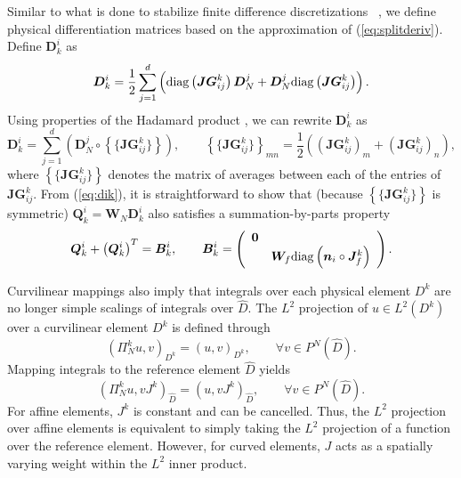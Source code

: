 \documentclass[preprint,10pt]{article}
\theoremstyle{definition}
\theoremstyle{lemma}
\theoremstyle{theorem}
\theoremstyle{assumption}
\renewcommand{\hat}{\widehat}
\newcommand{\LRp}[1]{\left( #1 \right)}
\newcommand{\LRc}[1]{\left\{ #1 \right\}}
\newcommand{\avg}[1] {\ensuremath{\LRc{\!\{#1\}\!}}}
\newcommand{\note}[1]{{\color{blue}{#1}}}
\newcommand{\lcwnote}[1]{{\color{magenta}{#1}}}
\newcommand{\diag}[1]{{\rm diag}\LRp{#1}}
\begin{document}
{Similar to what is done to stabilize finite difference discretizations~\cite{nordstrom2006cfdf, gassner2016split} \lcwnote{(Check to see if we can find an earlier reference to this type of approximation.)} \note{I don't know if there is - I've noticed even Gassner and the SBP folks don't seem to cite anything on this}, we define physical differentiation matrices based on the approximation of (\ref{eq:splitderiv}).  Define $\bm{D}^i_k$ as
\[
  \bm{D}^i_k = \frac12 \sum_{j=1}^d \left(\diag{\bm{JG}^k_{ij}}\bm{D}^j_N + \bm{D}^j_N\diag{\bm{JG}^k_{ij}}\right).
\]
Using properties of the Hadamard product \cite{horn2012matrix}, we can rewrite $\bm{D}^i_k$ as 
\begin{equation}
\bm{D}^i_k = \sum_{j=1}^d \LRp{\bm{D}^j_N \circ \avg{\bm{JG}^k_{ij}}}, \qquad \avg{\bm{JG}^k_{ij}}_{mn} = \frac{1}{2}\LRp{\LRp{\bm{JG}^k_{ij}}_m + \LRp{\bm{JG}^k_{ij}}_n},
\label{eq:dik}
\end{equation}
where $\avg{\bm{JG}^k_{ij}}$ denotes the matrix of averages between each of the entries of $\bm{JG}^k_{ij}$.  From (\ref{eq:dik}), it is straightforward to show that (because $\avg{\bm{JG}^k_{ij}}$ is symmetric) $\bm{Q}^i_k = \bm{W}_N\bm{D}^i_k$ also satisfies a summation-by-parts property
\begin{equation}
\bm{Q}^i_k + \LRp{\bm{Q}^i_k}^T = \bm{B}^i_k, \qquad \bm{B}^i_k = 
\LRp{\begin{array}{cc}
\bm{0}&\\
& \bm{W}_f \diag{\bm{n}_i\circ\bm{J}^k_f}
\end{array}}.
\label{eq:sbpk}
\end{equation}

Curvilinear mappings also imply that integrals over each physical element $D^k$ are no longer simple scalings of integrals over $\hat{D}$.  The $L^2$ projection of $u\in L^2\LRp{D^k}$ over a curvilinear element $D^k$ is defined through 
\begin{equation}
\LRp{\Pi^k_N u,v}_{D^k} = \LRp{u,v}_{D^k}, \qquad \forall v\in P^N\LRp{\hat{D}}.
\label{eq:l2curv}
\end{equation}
Mapping integrals to the reference element $\hat{D}$ yields
\begin{equation}
\LRp{\Pi^k_N u,v J^k}_{\hat{D}} = \LRp{u,vJ^k}_{\hat{D}}, \qquad \forall v\in P^N\LRp{\hat{D}}.
\label{eq:l2curvmap}
\end{equation}
For affine elements, $J^k$ is constant and can be cancelled.  Thus, the $L^2$ projection over affine elements is equivalent to simply taking the $L^2$ projection of a function over the reference element.  However, for curved elements, $J$ acts as a spatially varying weight within the $L^2$ inner product.  

}
\end{document}
